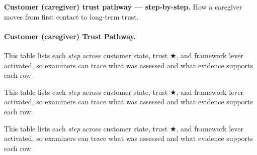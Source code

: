 \noindent\textbf{Customer (caregiver) trust pathway --- step-by-step.} How a caregiver moves from first contact to long-term trust.

\paragraph{Customer (caregiver) Trust Pathway.}



\noindent This table lists each \textit{step} across customer state, trust $\bigstar$, and framework lever activated, so examiners can trace what was assessed and what evidence supports each row.



\noindent This table lists each \textit{step} across customer state, trust $\bigstar$, and framework lever activated, so examiners can trace what was assessed and what evidence supports each row.


\noindent This table lists each \textit{step} across customer state, trust $\bigstar$, and framework lever activated, so examiners can trace what was assessed and what evidence supports each row.



